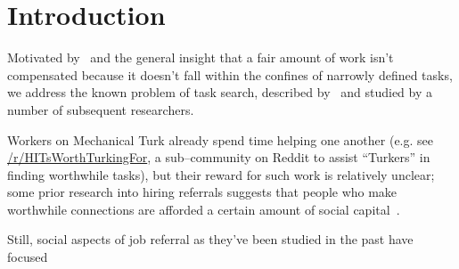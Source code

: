 \documentclass[main]{subfiles}
\begin{document}
\section{Introduction}\label{sec:introduction}

Motivated by~\cite{crowdcollab} and the general insight that a fair amount of work
isn't compensated because it doesn't fall within the confines of narrowly defined tasks,
we address the known problem of task search, described by~\cite{taskSearch}
and studied by a number of subsequent researchers.

Workers on Mechanical Turk already spend time helping one another
(e.g. see \href{https://www.reddit.com/r/HITsWorthTurkingFor/}{/r/HITsWorthTurkingFor},
a sub--community on Reddit to assist ``Turkers'' in finding worthwhile tasks),
but their reward for such work is relatively unclear;
some prior research into hiring referrals suggests that
people who make worthwhile connections are afforded a certain amount of
social capital~\cite[see][]{Gemkow2011}.

Still, social aspects of job referral as they've been studied in the past have focused

\onlyinsubfile{
  \printbibliography
}
\end{document}
